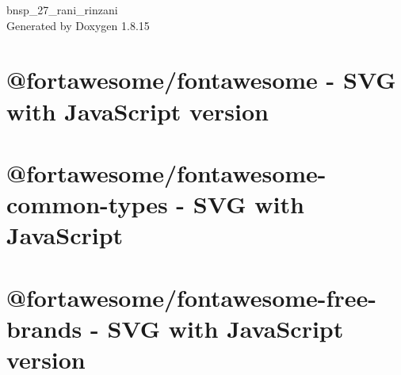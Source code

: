 \let\mypdfximage\pdfximage\def\pdfximage{\immediate\mypdfximage}\documentclass[twoside]{book}
\newcommand{\+}{\discretionary{\mbox{\scriptsize$\hookleftarrow$}}{}{}}
\newcommand{\clearemptydoublepage}{%
  \newpage{\pagestyle{empty}\cleardoublepage}%
}
\begin{document}
\hypersetup{pageanchor=false,
             bookmarksnumbered=true,
             pdfencoding=unicode
            }
\begin{titlepage}
\vspace*{7cm}
\begin{center}%
{\Large bnsp\+\_\+27\+\_\+rani\+\_\+rinzani }\\
\vspace*{1cm}
{\large Generated by Doxygen 1.8.15}\\
\end{center}
\end{titlepage}
\clearemptydoublepage
{}
\tableofcontents
\clearemptydoublepage
{}
\hypersetup{pageanchor=true}

\chapter{@fortawesome/fontawesome -\/ S\+VG with Java\+Script version}
\label{md_assets_css_fontawesome-free-5_80_88_advanced-options_use-with-node-js_fontawesome__r_e_a_d_m_e}

\chapter{@fortawesome/fontawesome-\/common-\/types -\/ S\+VG with Java\+Script}
\label{md_assets_css_fontawesome-free-5_80_88_advanced-options_use-with-node-js_fontawesome-common-types__r_e_a_d_m_e}

\chapter{@fortawesome/fontawesome-\/free-\/brands -\/ S\+VG with Java\+Script version}
\label{md_assets_css_fontawesome-free-5_80_88_advanced-options_use-with-node-js_fontawesome-free-brands__r_e_a_d_m_e}

\end{document}
